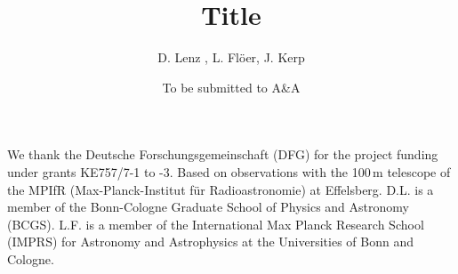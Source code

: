 \documentclass{aa}
\begin{document}
 

\title{Title}
\subtitle{}

\author{D. Lenz , L. Fl\"oer, J. Kerp }


\date{To be submitted to A\&A}





\maketitle









\begin{acknowledgements}
We thank the Deutsche Forschungsgemeinschaft (DFG) for the project funding under grants KE757/7-1 to -3. Based on observations with the 100\,m telescope of the MPIfR (Max-Planck-Institut f\"{u}r Radioastronomie) at Effelsberg. D.L. is a member of the Bonn-Cologne Graduate School of Physics and Astronomy (BCGS). L.F. is a member of the International Max Planck Research School (IMPRS) for Astronomy and Astrophysics at the Universities of Bonn and Cologne. 
\end{acknowledgements}



	

\begin{appendix}

\end{appendix}
\end{document}
